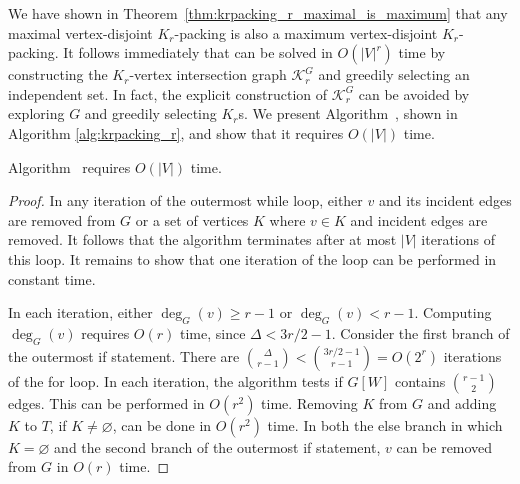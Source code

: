 We have shown in Theorem~\ref{thm:krpacking_r_maximal_is_maximum} that any maximal vertex-disjoint $K_r$-packing is also a maximum vertex-disjoint $K_r$-packing. It follows immediately that \vdkr can be solved in $O(|V|^r)$ time by constructing the $K_r$-vertex intersection graph $\mathcal{K}_r^G$ and greedily selecting an independent set. In fact, the explicit construction of $\mathcal{K}_r^G$ can be avoided by exploring $G$ and greedily selecting $K_r$s. We present Algorithm~, shown in Algorithm \ref{alg:krpacking_r}, and show that it requires $O(|V|)$ time.



\begin{lem}
\label{lem:krpacking_lineartimealgorunningtime}
Algorithm~ requires $O(|V|)$ time.
\end{lem}
\begin{proof}
In any iteration of the outermost while loop, either $v$ and its incident edges are removed from $G$ or a set of vertices $K$ where $v\in K$ and incident edges are removed. It follows that the algorithm terminates after at most $|V|$ iterations of this loop. It remains to show that one iteration of the loop can be performed in constant time.

In each iteration, either $\deg_{G}(v) \geq r-1$ or $\deg_{G}(v) < r - 1$. Computing $\deg_{G}(v)$ requires $O(r)$ time, since $\Delta < 3r/2 - 1$.  
Consider the first branch of the outermost if statement. There are $\binom{\Delta}{r-1} < \binom{3r/2-1}{r-1}=O(2^r)$ iterations of the for loop. In each iteration, the algorithm tests if $G[W]$ contains $\binom{r-1}{2}$ edges. This can be performed in $O(r^2)$ time. Removing $K$ from $G$ and adding $K$ to $T$, if $K\neq \varnothing$, can be done in $O(r^2)$ time. In both the else branch in which $K=\varnothing$ and the second branch of the outermost if statement, $v$ can be removed from $G$ in $O(r)$ time.
\end{proof}

